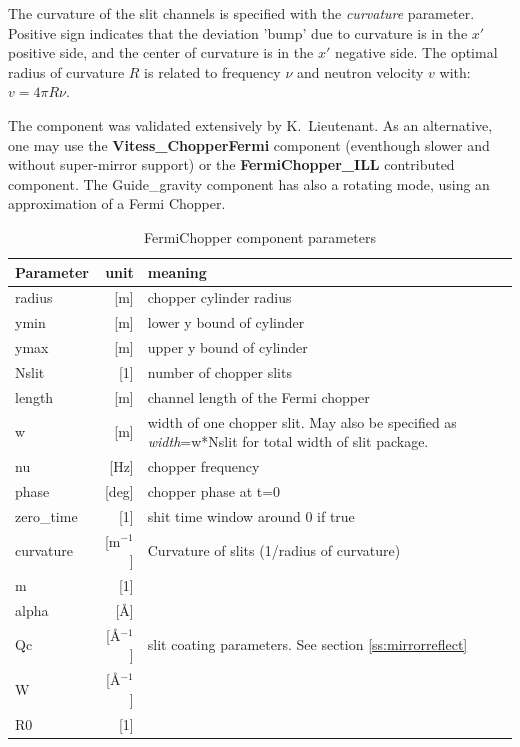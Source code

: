 The curvature of the slit channels is specified with the \textit{curvature} parameter. Positive sign indicates that the deviation 'bump' due to curvature is in the $x'$ positive side, and the center of curvature is in the $x'$ negative side. The optimal radius of curvature $R$ is related to frequency $\nu$ and neutron velocity $v$ with: $v=4 \pi R \nu$.

The component was validated extensively by K.\ Lieutenant. As an alternative, one may use the \textbf{Vitess\_ChopperFermi} component (eventhough slower and without super-mirror support) or the \textbf{FermiChopper\_ILL} contributed component. The Guide\_gravity component has also a rotating mode, using an approximation of a Fermi Chopper.

\begin{table}
  \begin{center}
  {\let\my=\\
    \begin{tabular}{|lr|p{}|}
    \hline
Parameter & unit & meaning \\
    \hline
radius & [m] & chopper cylinder radius \\
ymin   & [m] &   lower y bound of cylinder \\
ymax   & [m] &   upper y bound of cylinder \\
Nslit  & [1] &   number of chopper slits \\
length & [m] &   channel length of the Fermi chopper \\
w      & [m] &   width of one chopper slit. May also be specified as \emph{width}=w*Nslit for total width of slit package. \\
nu & [Hz] &  chopper frequency \\
phase     & [deg] &   chopper phase at t=0 \\
zero\_time & [1] & shit time window around 0 if true \\
curvature & [m$^{-1}$] & Curvature of slits (1/radius of curvature) \\
    \hline
m     & [1] & \\
alpha & [\AA] & \\
Qc    & [\AA$^{-1}$] & slit coating parameters. See section \ref{ss:mirrorreflect} \\
W     & [\AA$^{-1}$] & \\
R0    & [1] & \\
    \hline
    \end{tabular}
    \caption{FermiChopper component parameters}
    \label{t:fc-param}
  }
  \end{center}
\end{table}


